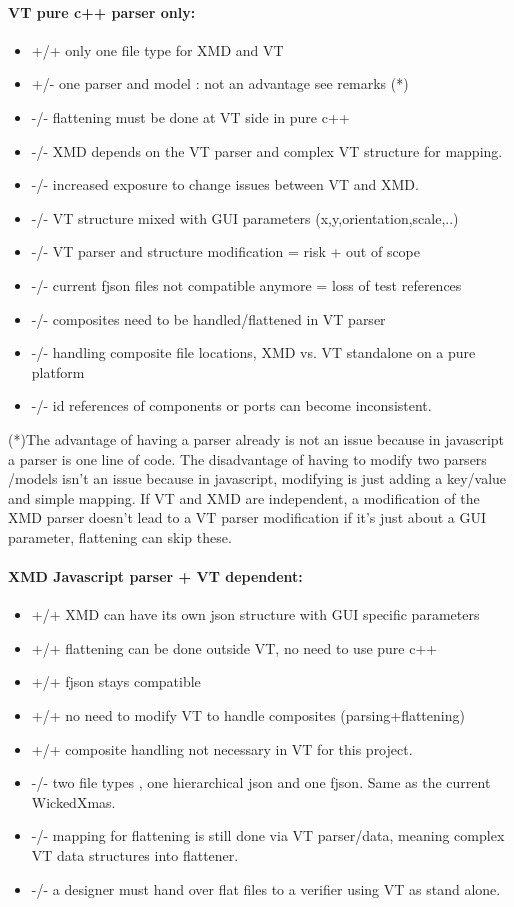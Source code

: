 \documentclass[a4paper,11pt,final]{article}
\begin{document}
\paragraph{VT pure c++ parser only:}
\begin{itemize}
\item +/+ only one file type for XMD and VT
\item +/- one parser and model : not an advantage see remarks (*)
\item -/- flattening must be done at VT side in pure c++
\item -/- XMD depends on the VT parser and complex VT structure for mapping.
\item -/- increased exposure to change issues between VT and XMD.
\item -/- VT structure mixed with GUI parameters (x,y,orientation,scale,..)
\item -/- VT parser and structure modification = risk + out of scope
\item -/- current fjson files not compatible anymore = loss of test references
\item -/- composites need to be handled/flattened in VT parser
\item -/- handling composite file locations, XMD vs. VT standalone on a pure platform
\item -/- id references of components or ports can become inconsistent.
\end{itemize}

(*)The advantage of having a parser already is not an issue because in
javascript a parser is one line of code.
The disadvantage of having to modify two parsers /models isn’t an issue
because in javascript, modifying is just adding a key/value and simple mapping.
If VT and XMD are independent, a modification of the XMD parser doesn’t lead to
a VT parser modification if it’s just about a GUI parameter, flattening can skip these.

\paragraph{XMD Javascript parser + VT dependent:}
\begin{itemize}
\item +/+ XMD can have its own json structure with GUI specific parameters
\item +/+ flattening can be done outside VT, no need to use pure c++
\item +/+ fjson stays compatible
\item +/+ no need to modify VT to handle composites (parsing+flattening)
\item +/+ composite handling not necessary in VT for this project.
\item -/- two file types , one hierarchical json and one fjson. Same as the current WickedXmas.
\item -/- mapping for flattening is still done via VT parser/data, meaning complex VT data structures into flattener.
\item -/- a designer must hand over flat files to a verifier using VT as stand alone. 
\end{itemize}
\end{document}
